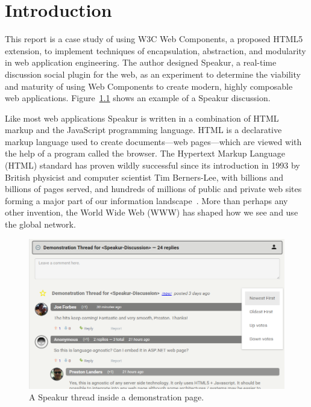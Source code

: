 \chapter{Introduction}
%
\label{ch:intro}

%
%

This report is a case study of using W3C Web Components, 
a proposed HTML5 extension,
to implement techniques of encapsulation, abstraction, 
and modularity in web application engineering.
The author designed Speakur, a real-time discussion social plugin for the web, 
as an experiment to determine the viability and maturity of using Web Components to create modern, highly composable web applications. 
Figure~\ref{f:demo1} shows an example of a Speakur discussion.

Like most web applications Speakur is written in a combination of HTML markup and the Java\-Script programming language. 
HTML is a declarative markup language used to create documents---web pages---which are viewed with the help of a program called the browser. 
The Hyper\-text Markup Language (HTML) 
standard has proven wildly successful since its introduction in 1993 by British physicist and computer scientist 
Tim Berners-Lee, 
with billions and billions of pages served, 
and hundreds of millions of public and private web sites forming a major part of our information landscape~\cite{internetlivestats.com2015}.
More than perhaps any other invention, the World Wide Web (WWW) has shaped how we see and use the global network.

\begin{figure}[htb]
\centering
 \includegraphics[width=\textwidth]{images/screenshot_20150312_1630_v2.png}
\caption{A Speakur thread inside a demonstration page.}
\label{f:demo1}
\end{figure}

